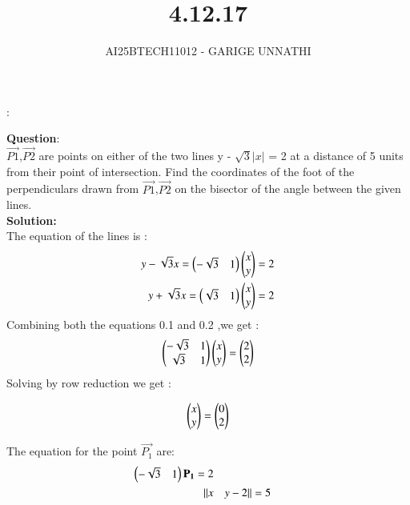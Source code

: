 \documentclass[journal]{IEEEtran}
\begin{document}



\title{4.12.17}
\author{AI25BTECH11012 - GARIGE UNNATHI}
{\let\newpage\relax\maketitle}


\renewcommand{\thefigure}{\theenumi}
\renewcommand{\thetable}{\theenumi}
\setlength{\intextsep}{10pt} %


:

\vspace{-1cm}

\textbf{Question}:\\
$\vec{P1}$,$\vec{P2}$ are points on either of the two lines y - $\sqrt{3}$$\lvert x \rvert$ = 2 at a distance of 5 units from their point of intersection. Find the coordinates of the foot of the perpendiculars drawn from $\vec{P1}$,$\vec{P2}$ on the bisector of the angle between the given lines.\\

\textbf{Solution:}\\

The equation of the lines is :
\begin{align}
  y - \sqrt{3}x = \begin{pmatrix}-\sqrt{3} & 1\end{pmatrix}\begin{pmatrix}x\\y\end{pmatrix} = 2\\
   y + \sqrt{3}x = \begin{pmatrix}\sqrt{3} & 1\end{pmatrix}\begin{pmatrix}x\\y\end{pmatrix} = 2 
\end{align}
Combining both the equations 0.1 and 0.2 ,we get :
\begin{align}
   \begin{pmatrix}-\sqrt{3} & 1\\
           \sqrt{3} & 1 \end{pmatrix}\begin{pmatrix}x\\y\end{pmatrix} = \begin{pmatrix}2\\2\end{pmatrix}
\end{align}
Solving by row reduction we get :

\begin{align}
\begin{pmatrix}x\\y\end{pmatrix} = \begin{pmatrix}0\\2\end{pmatrix}
\end{align}

The equation for the point $\vec{P_1}$ are:
\begin{align}
\begin{pmatrix}-\sqrt{3} & 1\end{pmatrix}\mathbf{P_1} = 2\\
\lVert x &\quad y-2 \rVert = 5
\end{align}
\end{document}
